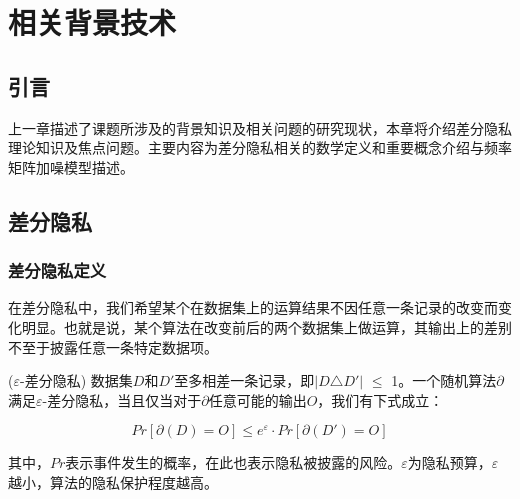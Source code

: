 


\chapter{相关背景技术}
\label{chap:background}

\section{引言}

上一章描述了课题所涉及的背景知识及相关问题的研究现状，本章将介绍差分隐私理论知识及焦点问题。主要内容为差分隐私相关的数学定义和重要概念介绍与频率矩阵加噪模型描述。

\section{差分隐私}

\subsection{差分隐私定义}

在差分隐私中，我们希望某个在数据集上的运算结果不因任意一条记录的改变而变化明显。也就是说，某个算法在改变前后的两个数据集上做运算，其输出上的差别不至于披露任意一条特定数据项。

\begin{defn}
	
($\varepsilon$\textsc{-差分隐私})\cite{Dwork Calibrating} 数据集$D$和$D'$至多相差一条记录，即$|D$$\triangle$$D'|$ $\leqslant$ 1。一个随机算法$\partial$满足$\varepsilon$-差分隐私，当且仅当对于$\partial$任意可能的输出$O$，我们有下式成立：

\begin{equation}
  \label{eq:res1}
	 Pr[\partial(D) = O] \leqslant e^{\varepsilon} \cdot Pr[\partial(D') = O]
\end{equation}


其中，$Pr$表示事件发生的概率，在此也表示隐私被披露的风险。$\varepsilon$为隐私预算，$\varepsilon$越小，算法的隐私保护程度越高。

\end{defn}

